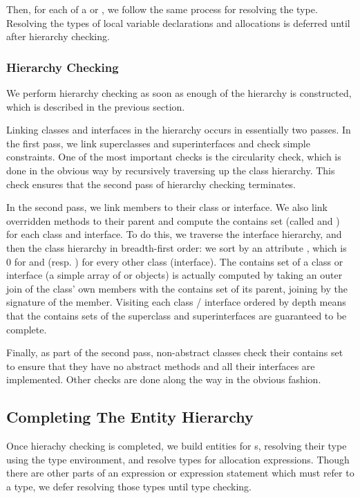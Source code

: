 \documentclass[pdftex,11pt,a4paper]{article}
\begin{document}
Then, for each  of a  or
, we follow the same process for resolving the
type. Resolving the types of local variable declarations and
allocations is deferred until after hierarchy checking.

\subsubsection{Hierarchy Checking}

We perform hierarchy checking as soon as enough of the hierarchy is
constructed, which is described in the previous section.

Linking classes and interfaces in the hierarchy occurs in essentially
two passes. In the first pass, we link superclasses and
superinterfaces and check simple constraints. One of the most
important checks is the circularity check, which is done in the
obvious way by recursively traversing up the class hierarchy. This
check ensures that the second pass of hierarchy checking terminates.

In the second pass, we link members to their class or interface. We also link
overridden methods to their parent and compute the contains set (called
 and ) for each class and interface. To do
this, we traverse the interface hierarchy, and then the class hierarchy in
breadth-first order: we sort by an attribute , which is 0 for
 and  (resp. ) for every other class (interface). The contains set
of a class or interface (a simple array of  or  objects)
is actually computed by taking an outer join of the class' own members with the
contains set of its parent, joining by the signature of the member.  Visiting
each class / interface ordered by depth means that the contains sets of the
superclass and superinterfaces are guaranteed to be complete.

Finally, as part of the second pass, non-abstract classes check their
contains set to ensure that they have no abstract methods and all
their interfaces are implemented. Other checks are done along the way
in the obvious fashion.

\subsection{Completing The Entity Hierarchy}

Once hierachy checking is completed, we build entities for
s, resolving their type using the type
environment, and resolve types for allocation expressions. Though
there are other parts of an expression or expression statement which
must refer to a type, we defer resolving those types until type
checking.
\end{document}

